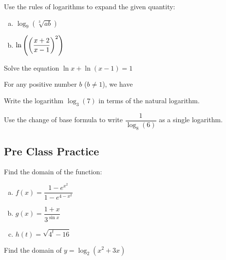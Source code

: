 \documentclass[notes]{subfiles}
\begin{document}
		\begin{ex}
			Use the rules of logarithms to expand the given quantity:
			\begin{enumerate}[(a)]
				\item \(\log_9 (\sqrt[3]{ab})\)
					
				\item \(\ln\left( \left( \dfrac{x+2}{x-1}\right)^2\right)\)
			\end{enumerate}
		\end{ex}
			\newpage
			
		\begin{ex}
			Solve the equation \(\ln x + \ln (x-1) = 1\)
		\end{ex}
			\vs{1}
			
		\begin{rmk}
			For any positive number \(b\) (\(b\neq 1\)), we have
				\[\]
		\end{rmk}
		
		\begin{ex}
			Write the logarithm \(\log_3(7)\) in terms of the natural logarithm.
		\end{ex}
			\vs{1}
			
		\begin{ex}
			Use the change of base formula to write \(\dfrac{1}{\log_8(6)}\) as a single logarithm.
		\end{ex}
			\vs{1}
		
		\newpage
		
	\subsection*{Pre Class Practice}
		\begin{ex}
			Find the domain of the function:
			\begin{enumerate}[(a)]
				\item \(f(x) = \dfrac{1-e^{x^2}}{1-e^{4-x^2}}\)
					\vs{1}
					
				\item \(g(x) = \dfrac{1+x}{3^{\sin x}}\)
					\vs{1}
					
				\item \(h(t) = \sqrt{4^t - 16}\)
					\vs{1}
			\end{enumerate}	
		\end{ex}
		
		\begin{ex}
			Find the domain of \(y =  \log_2(x^2 +3x)\)
		\end{ex}
			
\end{document}
